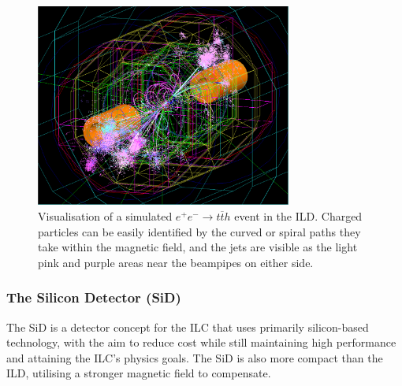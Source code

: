 %

\begin{figure}[h]
	\centering
	\includegraphics[width=0.75\textwidth]{../Pictures/SimulatedEvent1.png}
	\caption{Visualisation of a simulated $e^+ e^- \rightarrow t \overline{t} h$ event in the \acrshort{ILD}. Charged particles can be easily identified by the curved or spiral paths they take within the magnetic field, and the jets are visible as the light pink and purple areas near the beampipes on either side.}
	\label{figure:colliders/ILD/tth-simulation}
\end{figure}

\subsubsection{The Silicon Detector (SiD)}
The \acrfull{SiD} is a detector concept for the \acrshort{ILC} that uses primarily silicon-based technology, with the aim to reduce cost while still maintaining high performance and attaining the \acrshort{ILC}'s physics goals. The \acrshort{SiD} is also more compact than the \acrshort{ILD}, utilising a stronger magnetic field to compensate.

